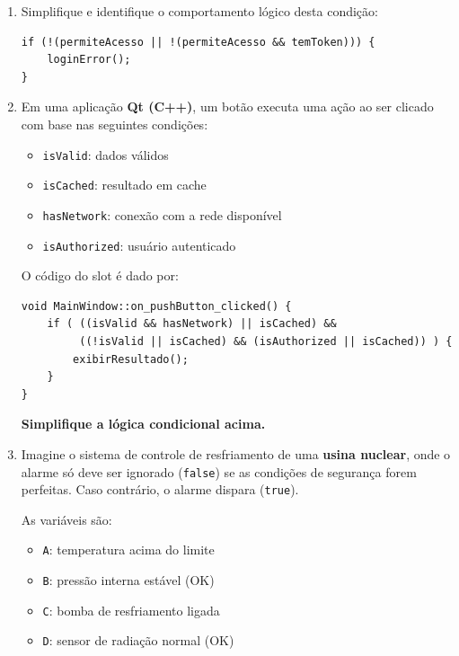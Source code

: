 \documentclass[12pt]{article}
\begin{document}
\begin{enumerate}[label=\textbf{\arabic*.}]
\vspace{0.1cm}

\item Simplifique e identifique o comportamento lógico desta condição:
\begin{codeblock}
\begin{verbatim}
if (!(permiteAcesso || !(permiteAcesso && temToken))) {
    loginError();
}
\end{verbatim}
\end{codeblock}

\vspace{0.1cm}
\item Em uma aplicação \textbf{Qt (C++)}, um botão executa uma ação ao ser clicado com base nas seguintes condições:
\begin{itemize}
\item \texttt{isValid}: dados válidos
\item \texttt{isCached}: resultado em cache
\item \texttt{hasNetwork}: conexão com a rede disponível
\item \texttt{isAuthorized}: usuário autenticado
\end{itemize}

O código do slot é dado por:

\begin{codeblock}
\begin{verbatim}
void MainWindow::on_pushButton_clicked() {
    if ( ((isValid && hasNetwork) || isCached) &&
         ((!isValid || isCached) && (isAuthorized || isCached)) ) {
        exibirResultado();
    }
}
\end{verbatim}
\end{codeblock}

\vspace{0.2cm}

\textbf{Simplifique a lógica condicional acima.}

\vspace{0.3cm}

\item Imagine o sistema de controle de resfriamento de uma \textbf{usina nuclear}, onde o alarme só deve ser ignorado (\texttt{false}) se as condições de segurança forem perfeitas. Caso contrário, o alarme dispara (\texttt{true}).

As variáveis são:
\begin{itemize}
\item \texttt{A}: temperatura acima do limite
\item \texttt{B}: pressão interna estável (OK)
\item \texttt{C}: bomba de resfriamento ligada
\item \texttt{D}: sensor de radiação normal (OK)
\end{itemize}


\end{enumerate}
\end{document}
